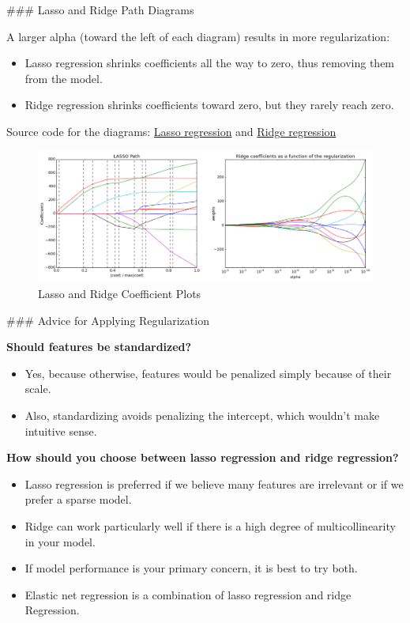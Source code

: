 \documentclass[11pt]{article}
\makeatletter
\def\maxwidth{\ifdim\Gin@nat@width>\linewidth\linewidth
    \else\Gin@nat@width\fi}
\let\Oldincludegraphics\includegraphics
\renewcommand{\includegraphics}[1]{\Oldincludegraphics[width=.8\maxwidth]{#1}}
\providecommand{\tightlist}{%
      \setlength{\itemsep}{0pt}\setlength{\parskip}{0pt}}
\makeatother
\begin{document}
     \#\#\# Lasso and Ridge Path Diagrams

A larger alpha (toward the left of each diagram) results in more
regularization:

\begin{itemize}
\tightlist
\item
  Lasso regression shrinks coefficients all the way to zero, thus
  removing them from the model.
\item
  Ridge regression shrinks coefficients toward zero, but they rarely
  reach zero.
\end{itemize}

Source code for the diagrams:
\href{http://scikit-learn.org/stable/auto_examples/linear_model/plot_lasso_lars.html}{Lasso
regression} and
\href{http://scikit-learn.org/stable/auto_examples/linear_model/plot_ridge_path.html}{Ridge
regression}

    \begin{figure}
\centering
\includegraphics{./assets/lasso_ridge_path.png}
\caption{Lasso and Ridge Coefficient Plots}
\end{figure}

     \#\#\# Advice for Applying Regularization

\textbf{Should features be standardized?}

\begin{itemize}
\tightlist
\item
  Yes, because otherwise, features would be penalized simply because of
  their scale.
\item
  Also, standardizing avoids penalizing the intercept, which wouldn't
  make intuitive sense.
\end{itemize}

\textbf{How should you choose between lasso regression and ridge
regression?}

\begin{itemize}
\tightlist
\item
  Lasso regression is preferred if we believe many features are
  irrelevant or if we prefer a sparse model.
\item
  Ridge can work particularly well if there is a high degree of
  multicollinearity in your model.
\item
  If model performance is your primary concern, it is best to try both.
\item
  Elastic net regression is a combination of lasso regression and ridge
  Regression.
\end{itemize}
\end{document}
